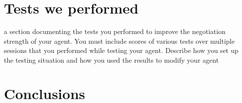 \documentclass[11pt,a4paper]{report}
\begin{document}
%
%




\newpage





\section*{Tests we performed}

a section documenting the tests you performed to improve the negotiation strength of your agent.
You must include scores of various tests over multiple sessions that you performed while testing
your agent. Describe how you set up the testing situation and how you used the results to modify
your agent

\section*{Conclusions}
\end{document}
